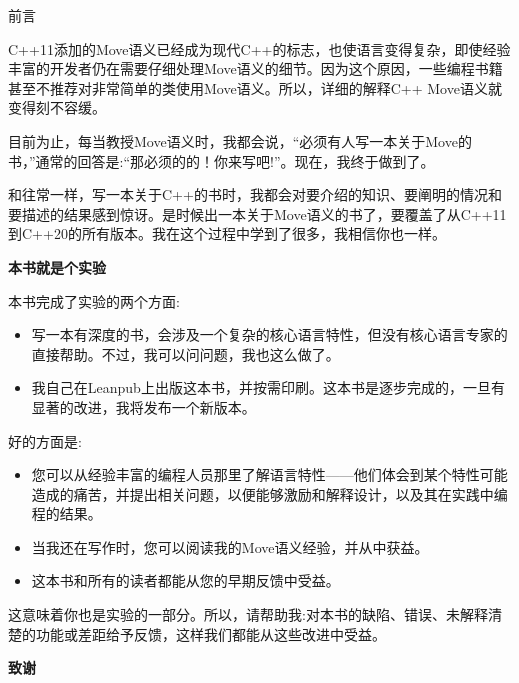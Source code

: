 \begin{flushright}
	 前言
\end{flushright}

C++11添加的Move语义已经成为现代C++的标志，也使语言变得复杂，即使经验丰富的开发者仍在需要仔细处理Move语义的细节。因为这个原因，一些编程书籍甚至不推荐对非常简单的类使用Move语义。所以，详细的解释C++ Move语义就变得刻不容缓。\par

目前为止，每当教授Move语义时，我都会说，“必须有人写一本关于Move的书，”通常的回答是:“那必须的的！你来写吧!”。现在，我终于做到了。\par

和往常一样，写一本关于C++的书时，我都会对要介绍的知识、要阐明的情况和要描述的结果感到惊讶。是时候出一本关于Move语义的书了，要覆盖了从C++11到C++20的所有版本。我在这个过程中学到了很多，我相信你也一样。 \par

\hspace*{\fill} \par %
\textbf{本书就是个实验}

本书完成了实验的两个方面:\par
\begin{itemize}
	\item 写一本有深度的书，会涉及一个复杂的核心语言特性，但没有核心语言专家的直接帮助。不过，我可以问问题，我也这么做了。
	\item 我自己在Leanpub上出版这本书，并按需印刷。这本书是逐步完成的，一旦有显著的改进，我将发布一个新版本。
\end{itemize}

好的方面是:\par
\begin{itemize}
	\item 您可以从经验丰富的编程人员那里了解语言特性——他们体会到某个特性可能造成的痛苦，并提出相关问题，以便能够激励和解释设计，以及其在实践中编程的结果。
	\item 当我还在写作时，您可以阅读我的Move语义经验，并从中获益。
	\item 这本书和所有的读者都能从您的早期反馈中受益。
\end{itemize}

这意味着你也是实验的一部分。所以，请帮助我:对本书的缺陷、错误、未解释清楚的功能或差距给予反馈，这样我们都能从这些改进中受益。\par

\hspace*{\fill} \par %
\textbf{致谢}

